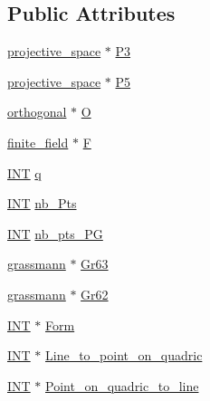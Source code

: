 \subsection*{Public Attributes}
\begin{DoxyCompactItemize}
\item 
\mbox{\hyperlink{classprojective__space}{projective\+\_\+space}} $\ast$ \mbox{\hyperlink{classklein__correspondence_a419013da57399929123cbbc22eebd362}{P3}}
\item 
\mbox{\hyperlink{classprojective__space}{projective\+\_\+space}} $\ast$ \mbox{\hyperlink{classklein__correspondence_af80102942532aed93f67d36ac02660f8}{P5}}
\item 
\mbox{\hyperlink{classorthogonal}{orthogonal}} $\ast$ \mbox{\hyperlink{classklein__correspondence_a38becc70e93298d33c09f224d385ec08}{O}}
\item 
\mbox{\hyperlink{classfinite__field}{finite\+\_\+field}} $\ast$ \mbox{\hyperlink{classklein__correspondence_a0559375273b3910894635a5036afcdd9}{F}}
\item 
\mbox{\hyperlink{galois_8h_a09fddde158a3a20bd2dcadb609de11dc}{I\+NT}} \mbox{\hyperlink{classklein__correspondence_af8e70a706ee72d93b14a4ed91774df78}{q}}
\item 
\mbox{\hyperlink{galois_8h_a09fddde158a3a20bd2dcadb609de11dc}{I\+NT}} \mbox{\hyperlink{classklein__correspondence_a620848262e5c9e100e0857167a9b9845}{nb\+\_\+\+Pts}}
\item 
\mbox{\hyperlink{galois_8h_a09fddde158a3a20bd2dcadb609de11dc}{I\+NT}} \mbox{\hyperlink{classklein__correspondence_a45c5c9f150fd5a87ce65c90f8e6abe0e}{nb\+\_\+pts\+\_\+\+PG}}
\item 
\mbox{\hyperlink{classgrassmann}{grassmann}} $\ast$ \mbox{\hyperlink{classklein__correspondence_afcfb846fbc5b14fe6e840e21a3e3c4d1}{Gr63}}
\item 
\mbox{\hyperlink{classgrassmann}{grassmann}} $\ast$ \mbox{\hyperlink{classklein__correspondence_aba6845f3e0cb5cae63e03cc17f12d03f}{Gr62}}
\item 
\mbox{\hyperlink{galois_8h_a09fddde158a3a20bd2dcadb609de11dc}{I\+NT}} $\ast$ \mbox{\hyperlink{classklein__correspondence_a689122e650d541462783250aaa1551b1}{Form}}
\item 
\mbox{\hyperlink{galois_8h_a09fddde158a3a20bd2dcadb609de11dc}{I\+NT}} $\ast$ \mbox{\hyperlink{classklein__correspondence_a1a1ec21c7dbb0157aa551e46e4bb1fc9}{Line\+\_\+to\+\_\+point\+\_\+on\+\_\+quadric}}
\item 
\mbox{\hyperlink{galois_8h_a09fddde158a3a20bd2dcadb609de11dc}{I\+NT}} $\ast$ \mbox{\hyperlink{classklein__correspondence_af43585c748a59d2c758ce9a37908e90e}{Point\+\_\+on\+\_\+quadric\+\_\+to\+\_\+line}}

\end{DoxyCompactItemize}
